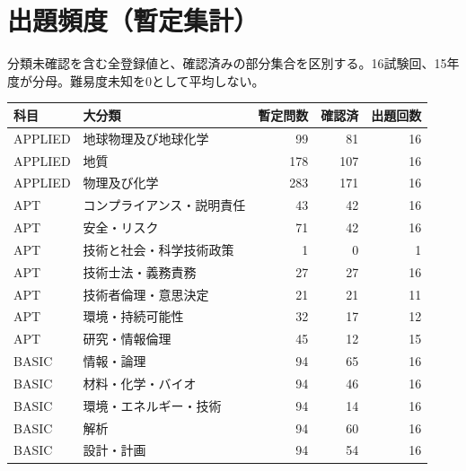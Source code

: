 \chapter{出題頻度（暫定集計）}
分類未確認を含む全登録値と、確認済みの部分集合を区別する。16試験回、15年度が分母。難易度未知を0として平均しない。
\begin{longtable}{p{.16\linewidth}p{.42\linewidth}rrr}
科目 & 大分類 & 暫定問数 & 確認済 & 出題回数\\\hline
APPLIED & 地球物理及び地球化学 & 99 & 81 & 16\\
APPLIED & 地質 & 178 & 107 & 16\\
APPLIED & 物理及び化学 & 283 & 171 & 16\\
APT & コンプライアンス・説明責任 & 43 & 42 & 16\\
APT & 安全・リスク & 71 & 42 & 16\\
APT & 技術と社会・科学技術政策 & 1 & 0 & 1\\
APT & 技術士法・義務責務 & 27 & 27 & 16\\
APT & 技術者倫理・意思決定 & 21 & 21 & 11\\
APT & 環境・持続可能性 & 32 & 17 & 12\\
APT & 研究・情報倫理 & 45 & 12 & 15\\
BASIC & 情報・論理 & 94 & 65 & 16\\
BASIC & 材料・化学・バイオ & 94 & 46 & 16\\
BASIC & 環境・エネルギー・技術 & 94 & 14 & 16\\
BASIC & 解析 & 94 & 60 & 16\\
BASIC & 設計・計画 & 94 & 54 & 16\\
\end{longtable}
